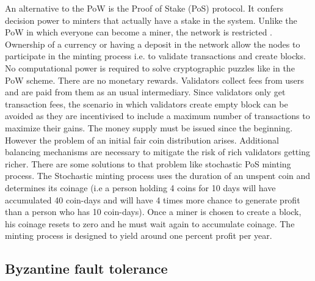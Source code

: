 \documentclass{article}
\begin{document}
An alternative to the PoW is the Proof of Stake (PoS) protocol. It confers
decision power to minters that actually have a stake in the system. Unlike the
PoW in which everyone can become a miner, the network is restricted . Ownership of a currency or having a deposit in the network allow the nodes to participate in the minting process i.e. to validate transactions and create blocks. No computational power is required to solve cryptographic puzzles like in the PoW scheme. There are no monetary rewards. Validators collect fees from users and are paid from them as an usual intermediary. Since validators only get transaction fees, the scenario in which validators create empty block can be avoided as they are incentivised to include a maximum number of transactions to maximize their gains. The money supply must be issued since the beginning. However the problem of an initial fair coin distribution arises. Additional balancing mechanisms are necessary to mitigate the risk of rich validators getting richer. There are some solutions to that problem like stochastic PoS minting process. The Stochastic minting process uses the duration of an unspent coin and determines its coinage (i.e a person holding 4 coins for 10 days will have accumulated 40 coin-days and will have 4 times more chance to generate profit than a person who has 10 coin-days). Once a miner is chosen to create a block, his coinage resets to zero and he must wait again to accumulate coinage. The minting process is designed to yield around one percent profit per year.


\subsection{Byzantine fault tolerance}
\end{document}
